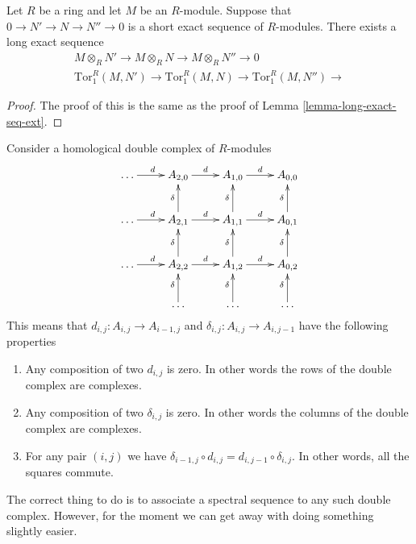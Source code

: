 \begin{lemma}
\label{lemma-long-exact-sequence-tor}
Let $R$ be a ring and let $M$ be an $R$-module.
Suppose that $0 \to N' \to N \to N'' \to 0$ is a short
exact sequence of $R$-modules. There exists a long 
exact sequence
$$
\begin{matrix}
M \otimes_R N'
\to M\otimes_R N
\to M\otimes_R N''
\to 0
\\
\text{Tor}_1^R(M, N')
\to \text{Tor}_1^R(M, N)
\to \text{Tor}_1^R(M, N'')
\to
\end{matrix}
$$
\end{lemma}

\begin{proof}
The proof of this is the same as the proof of
Lemma \ref{lemma-long-exact-seq-ext}.
\end{proof}

\noindent
Consider a homological double complex of $R$-modules
$$
\xymatrix{
\ldots \ar[r]^d &
A_{2,0} \ar[r]^d &
A_{1,0} \ar[r]^d &
A_{0,0} \cr
\ldots \ar[r]^d &
A_{2,1} \ar[r]^d \ar[u]^\delta &
A_{1,1} \ar[r]^d \ar[u]^\delta &
A_{0,1} \ar[u]^\delta \cr
\ldots \ar[r]^d &
A_{2,2} \ar[r]^d \ar[u]^\delta &
A_{1,2} \ar[r]^d \ar[u]^\delta &
A_{0,2} \ar[u]^\delta \cr
&
\ldots \ar[u]^\delta &
\ldots \ar[u]^\delta &
\ldots \ar[u]^\delta \cr
}
$$
This means that $d_{i,j} : A_{i,j} \to A_{i-1,j}$
and $\delta_{i,j} : A_{i,j} \to A_{i, j-1}$ have the following
properties
\begin{enumerate}
\item Any composition of two $d_{i,j}$ is zero. In other words
the rows of the double complex are complexes.
\item Any composition of two $\delta_{i,j}$ is zero. In other words
the columns of the double complex are complexes.
\item For any pair $(i,j)$ we have $\delta_{i-1,j} \circ d_{i,j}
= d_{i,j-1} \circ \delta_{i,j}$. In other words, all the squares
commute.
\end{enumerate}
The correct thing to do is to associate a spectral sequence to
any such double complex. However, for the moment we can get away with
doing something slightly easier.

